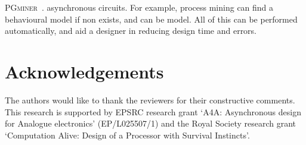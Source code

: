 \documentclass[british, journal]{IEEEtran}
\newcommand{\noun}[1]{\textsc{#1}}
\begin{document}

%
%
\noun{PGminer}~\cite{mokhov_2016_mining, pgminer}.
asynchronous circuits. For example, process mining can find a behavioural model
if non exists, and can be
model. All of this can be performed automatically, and aid a designer in
reducing design time and errors.
%


\section*{Acknowledgements}


The authors would like to thank the reviewers for their constructive
comments. This research is supported by EPSRC research grant `A4A:
Asynchronous design for Analogue electronics' (EP/L025507/1) and
the Royal Society research grant `Computation Alive: Design of a
Processor with Survival Instincts'.




\end{document}
